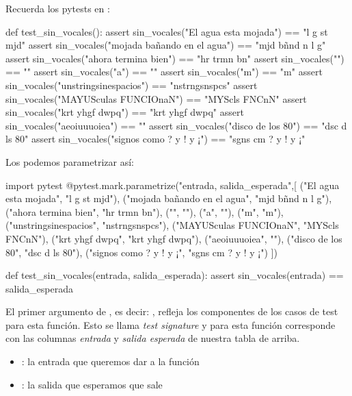 Recuerda los pytests en :

\begin{python}
def test_sin_vocales():
    assert sin_vocales("El agua esta mojada") == "l g st mjd"
    assert sin_vocales("mojada bañando en el agua") == "mjd bñnd n l g"
    assert sin_vocales("ahora termina bien") == "hr trmn bn"
    assert sin_vocales("") == ""
    assert sin_vocales("a") == ""
    assert sin_vocales("m") == "m"
    assert sin_vocales("unstringsinespacios") == "nstrngsnspcs"
    assert sin_vocales("MAYUSculas FUNCIOnaN") == "MYScls FNCnN"
    assert sin_vocales("krt yhgf dwpq") == "krt yhgf dwpq"
    assert sin_vocales("aeoiuuuoiea") == ""
    assert sin_vocales("disco de los 80") == "dsc d ls 80"
    assert sin_vocales("signos como ? y ! y ¡") == "sgns cm ? y ! y ¡"
\end{python}

Los podemos parametrizar así:

\begin{python}
import pytest
@pytest.mark.parametrize("entrada, salida_esperada",[
("El agua esta mojada", "l g st mjd"),           
("mojada bañando en el agua", "mjd bñnd n l g"),
("ahora termina bien", "hr trmn bn"),
("", ""),                                       
("a", ""), 
("m", "m"), 
("unstringsinespacios", "nstrngsnspcs"),        
("MAYUSculas FUNCIOnaN", "MYScls FNCnN"),       
("krt yhgf dwpq", "krt yhgf dwpq"),             
("aeoiuuuoiea", ""),                            
("disco de los 80", "dsc d ls 80"),             
("signos como ? y ! y ¡", "sgns cm ? y ! y ¡")   
])

def test_sin_vocales(entrada, salida_esperada):
    assert sin_vocales(entrada) == salida_esperada
\end{python}

El primer argumento de , es decir: , refleja los componentes de los casos de test para esta función. Esto se llama 
\emph{test signature} y para esta función corresponde con las columnas \textit{entrada} y \textit{salida esperada} de nuestra tabla de arriba.

\begin{itemize}
    \item {}: la entrada que queremos dar a la función
    \item {}: la salida que esperamos que sale
\end{itemize}

